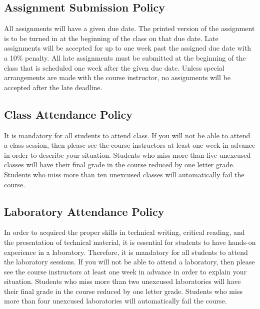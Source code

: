 \begin{itemize}

\end{itemize}

\subsection*{Assignment Submission Policy}

All assignments will have a given due date. The printed version of the
assignment is to be turned in at the beginning of the class on that due
date. Late assignments will be accepted for up to one week past the
assigned due date with a 10\% penalty. All late assignments must be
submitted at the beginning of the class that is scheduled one week after
the given due date. Unless special arrangements are made with the course
instructor, no assignments will be accepted after the late deadline.

\subsection*{Class Attendance Policy}

It is mandatory for all students to attend class. If you will not be
able to attend a class session, then please see the course instructors at
least one week in advance in order to describe your situation. Students
who miss more than five unexcused classes will have their final grade in
the course reduced by one letter grade. Students who miss more than ten
unexcused classes will automatically fail the course.

\subsection*{Laboratory Attendance Policy}

In order to acquired the proper skills in technical writing, critical
reading, and the presentation of technical material, it is essential
for students to have hands-on experience in a laboratory. Therefore,
it is mandatory for all students to attend the laboratory sessions. If
you will not be able to attend a laboratory, then please see the
course instructors at least one week in advance in order to explain
your situation. Students who miss more than two unexcused laboratories
will have their final grade in the course reduced by one letter grade.
Students who miss more than four unexcused laboratories will
automatically fail the course.

